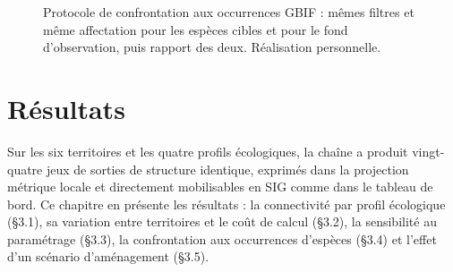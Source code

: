 \documentclass[a4paper,12pt]{report}
\begin{document}
\begin{figure}[H]
{}
\caption{Protocole de confrontation aux occurrences GBIF : mêmes filtres et même affectation pour les espèces cibles et pour le fond d'observation, puis rapport des deux. Réalisation personnelle.}
\label{fig:schema-gbif}
\end{figure}

\chapter{Résultats}
Sur les six territoires et les quatre profils écologiques, la chaîne a produit vingt-quatre jeux de sorties de structure identique, exprimés dans la projection métrique locale et directement mobilisables en SIG comme dans le tableau de bord. Ce chapitre en présente les résultats : la connectivité par profil écologique (§3.1), sa variation entre territoires et le coût de calcul (§3.2), la sensibilité au paramétrage (§3.3), la confrontation aux occurrences d'espèces (§3.4) et l'effet d'un scénario d'aménagement (§3.5).
\end{document}

